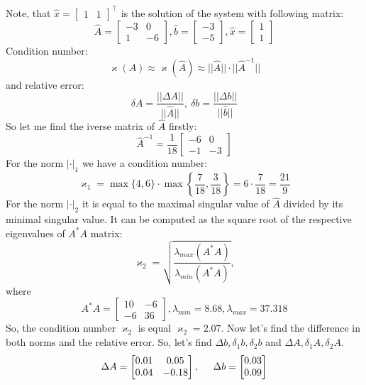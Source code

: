 \documentclass[12pt]{report}
\begin{document}
\begin{solution}
   Note, that $\hat{x} = \begin{bmatrix}
      1 & 1
   \end{bmatrix}^\intercal$ is the solution of the system with following matrix:
   \[
      \hat{A} = \begin{bmatrix} -3 & 0 \\ 1 & -6\end{bmatrix}, \hat{b} = \begin{bmatrix} -3 \\-5\end{bmatrix}, \hat{x} = \begin{bmatrix} 1 \\1\end{bmatrix}
   \]
  Condition number:
  \[
   \varkappa(A) \approx \varkappa(\hat{A}) \approx ||\hat{A}||\cdot||\hat{A}^{-1}||
  \]
  and relative error:
  \[
   \delta A = \dfrac{||\Delta A||}{||\hat{A}||}, \ \delta b = \dfrac{||\Delta b||}{||\hat{b}||}
  \]
  So let me find the iverse matrix of $\hat{A}$ firstly:
  \[
      \hat{A}^{-1} = \dfrac{1}{18} \begin{bmatrix}
         -6 & 0 \\
         -1 & -3
      \end{bmatrix}
  \]
  For the norm $|\cdot|_1$ we have a condition number:
  \[\varkappa_1 = \max\{4,6\} \cdot \max\left\{\dfrac{7}{18}, \dfrac{3}{18}\right\}= 6 \cdot \dfrac{7}{18} = \dfrac{21}{9}\]
  For the norm $|\cdot |_2$ it is equal to the maximal singular value of $\hat{A}$ divided by its minimal singular value. It can be computed as the square root of the respective eigenvalues of $A^*A$ matrix:
  \[
      \varkappa_2 = \sqrt{\dfrac{\lambda_{max}(A^*A)}{\lambda_{min}(A^*A)}},
  \] 
  where 
  \[
      A^*A = \begin{bmatrix}
         10  & -6 \\
        -6  &  36 
       \end{bmatrix}, \lambda_{min} = 8.68, \lambda_{max} = 37.318
  \]
  So, the condition number $\varkappa_2$ is equal $\varkappa_2 = 2.07$.
  Now let's find the difference in both norms and the relative error. So, let's find $\Delta b, \delta_1 b,\delta_2 b$ and $\Delta A, \delta_1 A,\delta_2 A$.
  \[\Delta A = \begin{bmatrix}0.01 & 0.05\\0.04 & -0.18\end{bmatrix}, \hspace*{0.5cm} \Delta b = \begin{bmatrix}0.03 \\ 0.09\end{bmatrix}\]

\end{solution}
\end{document}
